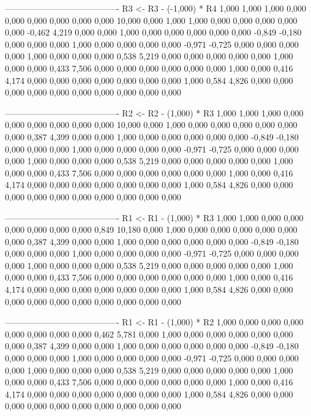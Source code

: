 \documentclass[12pt]{article}
\begin{document}
\begin{enumerate}
\begin{keluaran}
----------------------------------------
R3 <- R3 - (-1,000) * R4
1,000   1,000   1,000   0,000   0,000   0,000   0,000   0,000   0,000   10,000
0,000   1,000   1,000   0,000   0,000   0,000   0,000   0,000   -0,462  4,219
0,000   0,000   1,000   0,000   0,000   0,000   0,000   0,000   -0,849  -0,180
0,000   0,000   0,000   1,000   0,000   0,000   0,000   0,000   -0,971  -0,725
0,000   0,000   0,000   0,000   1,000   0,000   0,000   0,000   0,538   5,219
0,000   0,000   0,000   0,000   0,000   1,000   0,000   0,000   0,433   7,506
0,000   0,000   0,000   0,000   0,000   0,000   1,000   0,000   0,416   4,174
0,000   0,000   0,000   0,000   0,000   0,000   0,000   1,000   0,584   4,826
0,000   0,000   0,000   0,000   0,000   0,000   0,000   0,000   0,000   0,000

----------------------------------------
R2 <- R2 - (1,000) * R3
1,000   1,000   1,000   0,000   0,000   0,000   0,000   0,000   0,000   10,000
0,000   1,000   0,000   0,000   0,000   0,000   0,000   0,000   0,387   4,399
0,000   0,000   1,000   0,000   0,000   0,000   0,000   0,000   -0,849  -0,180
0,000   0,000   0,000   1,000   0,000   0,000   0,000   0,000   -0,971  -0,725
0,000   0,000   0,000   0,000   1,000   0,000   0,000   0,000   0,538   5,219
0,000   0,000   0,000   0,000   0,000   1,000   0,000   0,000   0,433   7,506
0,000   0,000   0,000   0,000   0,000   0,000   1,000   0,000   0,416   4,174
0,000   0,000   0,000   0,000   0,000   0,000   0,000   1,000   0,584   4,826
0,000   0,000   0,000   0,000   0,000   0,000   0,000   0,000   0,000   0,000

----------------------------------------
R1 <- R1 - (1,000) * R3
1,000   1,000   0,000   0,000   0,000   0,000   0,000   0,000   0,849   10,180
0,000   1,000   0,000   0,000   0,000   0,000   0,000   0,000   0,387   4,399
0,000   0,000   1,000   0,000   0,000   0,000   0,000   0,000   -0,849  -0,180
0,000   0,000   0,000   1,000   0,000   0,000   0,000   0,000   -0,971  -0,725
0,000   0,000   0,000   0,000   1,000   0,000   0,000   0,000   0,538   5,219
0,000   0,000   0,000   0,000   0,000   1,000   0,000   0,000   0,433   7,506
0,000   0,000   0,000   0,000   0,000   0,000   1,000   0,000   0,416   4,174
0,000   0,000   0,000   0,000   0,000   0,000   0,000   1,000   0,584   4,826
0,000   0,000   0,000   0,000   0,000   0,000   0,000   0,000   0,000   0,000

----------------------------------------
R1 <- R1 - (1,000) * R2
1,000   0,000   0,000   0,000   0,000   0,000   0,000   0,000   0,462   5,781
0,000   1,000   0,000   0,000   0,000   0,000   0,000   0,000   0,387   4,399
0,000   0,000   1,000   0,000   0,000   0,000   0,000   0,000   -0,849  -0,180
0,000   0,000   0,000   1,000   0,000   0,000   0,000   0,000   -0,971  -0,725
0,000   0,000   0,000   0,000   1,000   0,000   0,000   0,000   0,538   5,219
0,000   0,000   0,000   0,000   0,000   1,000   0,000   0,000   0,433   7,506
0,000   0,000   0,000   0,000   0,000   0,000   1,000   0,000   0,416   4,174
0,000   0,000   0,000   0,000   0,000   0,000   0,000   1,000   0,584   4,826
0,000   0,000   0,000   0,000   0,000   0,000   0,000   0,000   0,000   0,000


\end{keluaran}
\end{enumerate}
\end{document}
